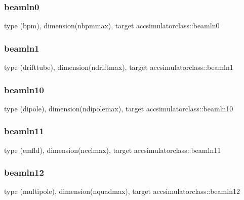 \subsubsection{\texorpdfstring{beamln0}{beamln0}}
{\footnotesize\ttfamily type (bpm), dimension(nbpmmax), target accsimulatorclass\+::beamln0}

\mbox{\label{namespaceaccsimulatorclass_a4afbfe5b21f1ef4f6ed80b26919a5b65}} 
\subsubsection{\texorpdfstring{beamln1}{beamln1}}
{\footnotesize\ttfamily type (drifttube), dimension(ndriftmax), target accsimulatorclass\+::beamln1}

\mbox{\label{namespaceaccsimulatorclass_a62ff8549366c26dee5a585c8d900ebac}} 
\subsubsection{\texorpdfstring{beamln10}{beamln10}}
{\footnotesize\ttfamily type (dipole), dimension(ndipolemax), target accsimulatorclass\+::beamln10}

\mbox{\label{namespaceaccsimulatorclass_a016c645050aaca47150651536833a42d}} 
\subsubsection{\texorpdfstring{beamln11}{beamln11}}
{\footnotesize\ttfamily type (emfld), dimension(ncclmax), target accsimulatorclass\+::beamln11}

\mbox{\label{namespaceaccsimulatorclass_a813aa983dff443b4b11bfcca3870d81a}} 
\subsubsection{\texorpdfstring{beamln12}{beamln12}}
{\footnotesize\ttfamily type (multipole), dimension(nquadmax), target accsimulatorclass\+::beamln12}

